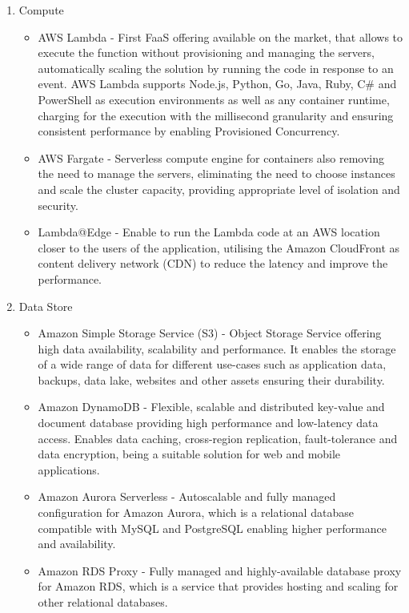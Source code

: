 \begin{enumerate}
   \item Compute
   \begin{itemize}
       \item AWS Lambda - First FaaS offering available on the market, that allows to execute the function without provisioning and managing the servers, automatically scaling the solution by running the code in response to an event. AWS Lambda supports Node.js, Python, Go, Java, Ruby, C\# and PowerShell as execution environments as well as any container runtime, charging for the execution with the millisecond granularity and ensuring consistent performance by enabling Provisioned Concurrency.
       \item AWS Fargate - Serverless compute engine for containers also removing the need to manage the servers, eliminating the need to choose instances and scale the cluster capacity, providing appropriate level of isolation and security.
       \item Lambda@Edge - Enable to run the Lambda code at an AWS location closer to the users of the application, utilising the Amazon CloudFront as content delivery network (CDN) to reduce the latency and improve the performance.
   \end{itemize}
   \item Data Store
   \begin{itemize}
       \item Amazon Simple Storage Service (S3) - Object Storage Service offering high data availability, scalability and performance. It enables the storage of a wide range of data for different use-cases such as application data, backups, data lake, websites and other assets ensuring their durability.
       \item Amazon DynamoDB - Flexible, scalable and distributed key-value and document database providing high performance and low-latency data access. Enables data caching, cross-region replication, fault-tolerance and data encryption, being a suitable solution for web and mobile applications.
       \item Amazon Aurora Serverless - Autoscalable and fully managed configuration for Amazon Aurora, which is a relational database compatible with MySQL and PostgreSQL enabling higher performance and availability.
       \item Amazon RDS Proxy - Fully managed and highly-available database proxy for Amazon RDS, which is a service that provides hosting and scaling for other relational databases.

\end{itemize}
\end{enumerate}
